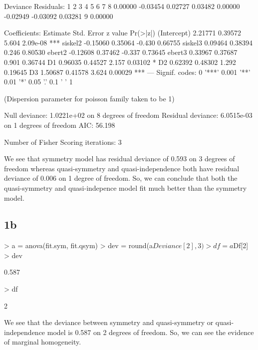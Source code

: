 \documentclass{article}
\begin{document}
\begin{Schunk}
\begin{Soutput}
Deviance Residuals: 
       1         2         3         4         5         6         7         8  
 0.00000  -0.03454   0.02727   0.03482   0.00000  -0.02949  -0.03092   0.03281  
       9  
 0.00000  

Coefficients:
            Estimate Std. Error z value Pr(>|z|)    
(Intercept)  2.21771    0.39572   5.604 2.09e-08 ***
siskel2     -0.15060    0.35064  -0.430  0.66755    
siskel3      0.09464    0.38394   0.246  0.80530    
ebert2      -0.12608    0.37462  -0.337  0.73645    
ebert3       0.33967    0.37687   0.901  0.36744    
D1           0.96035    0.44527   2.157  0.03102 *  
D2           0.62392    0.48302   1.292  0.19645    
D3           1.50687    0.41578   3.624  0.00029 ***
---
Signif. codes:  0 '***' 0.001 '**' 0.01 '*' 0.05 '.' 0.1 ' ' 1

(Dispersion parameter for poisson family taken to be 1)

    Null deviance: 1.0221e+02  on 8  degrees of freedom
Residual deviance: 6.0515e-03  on 1  degrees of freedom
AIC: 56.198

Number of Fisher Scoring iterations: 3
\end{Soutput}
\end{Schunk}

We see that symmetry model has residual deviance of 0.593 on 3 degrees of freedom whereas quasi-symmetry and quasi-independence both have residual deviance of 0.006 on 1 degree of freedom. So, we can conclude that both the quasi-symmetry and quasi-indepence model fit much better than the symmetry model.

\subsection{1b}
\begin{Schunk}
\begin{Sinput}
> a = anova(fit.sym, fit.qsym)
> dev = round(a$Deviance[2],3)
> df = a$Df[2]
> dev
\end{Sinput}
\begin{Soutput}
[1] 0.587
\end{Soutput}
\begin{Sinput}
> df
\end{Sinput}
\begin{Soutput}
[1] 2
\end{Soutput}
\end{Schunk}
We see that the deviance between symmetry and quasi-symmetry or quasi-independence model is 0.587 on 2 degrees of freedom. So, we can see the evidence of marginal homogeneity.
\end{document}
